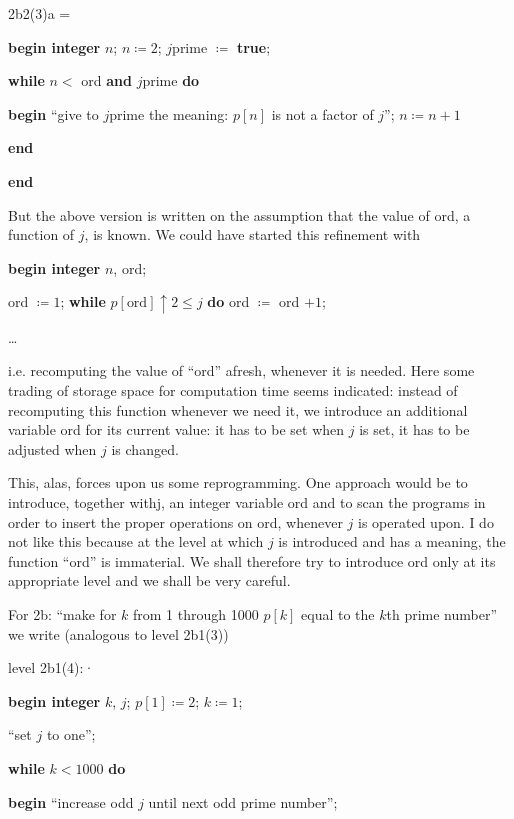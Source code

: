 \documentclass[twoside,11pt]{book}
\begin{document}
\noindent
2b2(3)a =

\noindent
\textbf{begin integer} $n$; $n \coloneq 2$; $j$prime $\coloneq$ \textbf{true};

\noindent
\quad\textbf{while} $n <$ ord \textbf{and} $j$prime \textbf{do}

\noindent
\quad\textbf{begin} ``give to $j$prime the meaning: $p[n]$ is not a factor of $j$''; $n \coloneq n + 1$

\noindent
\quad\textbf{end}

\noindent
\textbf{end}

But the above version is written on the assumption that the value of ord, a function of $j$, is known. We could have started this refinement with

\noindent
\textbf{begin integer} $n$, ord;

\noindent
\quad ord $\coloneq 1$; \textbf{while} $p[\text{ord}] \uparrow 2 \leqslant j$ \textbf{do} ord $\coloneq$ ord $+ 1$;

\noindent
\quad \dots

\noindent
i.e. recomputing the value of ``ord'' afresh, whenever it is needed. Here some trading of storage space for computation time seems indicated: instead of recomputing this function whenever we need it, we introduce an additional variable ord for its current value: it has to be set when $j$ is set, it has to be adjusted when $j$ is changed.

This, alas, forces upon us some reprogramming. One approach would be to introduce, together withj, an integer variable ord and to scan the programs in order to insert the proper operations on ord, whenever $j$ is operated upon. I do not like this because at the level at which $j$ is introduced and has a meaning, the function ``ord'' is immaterial. We shall therefore try to introduce ord only at its appropriate level and we shall be very careful.

For 2b: ``make for $k$ from 1 through 1000 $p[k]$ equal to the $k$th prime number'' we write (analogous to level 2b1(3))

\noindent
level 2b1(4):·

\noindent
\textbf{begin integer} $k$, $j$; $p[1] \coloneq 2$; $k \coloneq 1$;

\noindent
\quad ``set $j$ to one'';

\noindent
\quad\textbf{while} $k < 1000$ \textbf{do}

\noindent
\quad\textbf{begin} ``increase odd $j$ until next odd prime number'';
\end{document}
